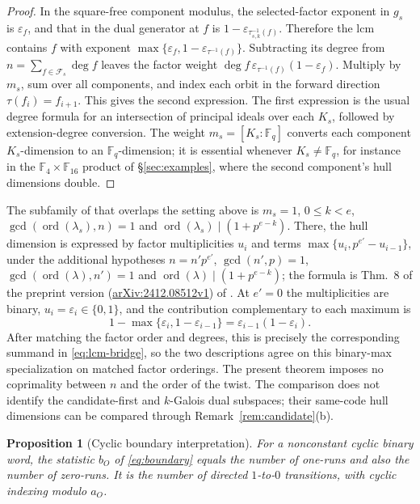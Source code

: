\documentclass[10pt,a4paper]{article}
\newcommand{\F}{\mathbb F}
\newcommand{\Fs}{\mathcal F_s}
\numberwithin{equation}{section}
\theoremstyle{plain}
\newtheorem{proposition}[theorem]{Proposition}
\theoremstyle{definition}
\theoremstyle{remark}
\begin{document}
\begin{proof}
In the square-free component modulus, the selected-factor exponent in $g_s$ is
$\varepsilon_f$, and that in the dual generator at $f$ is
$1-\varepsilon_{\tau_{s,k}^{-1}(f)}$. Therefore the lcm contains $f$ with
exponent $\max\{\varepsilon_f,1-\varepsilon_{\tau^{-1}(f)}\}$. Subtracting its
degree from $n=\sum_{f\in\Fs}\deg f$ leaves the factor weight
$\deg f\,\varepsilon_{\tau^{-1}(f)}(1-\varepsilon_f)$. Multiply by $m_s$, sum
over all components, and index each orbit in the forward direction
$\tau(f_i)=f_{i+1}$. This gives the second expression. The first expression is
the usual degree formula for an intersection of principal ideals over each $K_s$,
followed by extension-degree conversion. The weight $m_s=[K_s:\F_q]$ converts
each component $K_s$-dimension to an $\F_q$-dimension; it is essential whenever
$K_s\ne\F_q$, for instance in the $\F_4\times\F_{16}$ product of
\S\ref{sec:examples}, where the second component's hull dimensions double.
\end{proof}

The subfamily of \cite{debnathAffine2026} that overlaps the setting above is
$m_s=1$, $0\le k<e$, $\gcd(\operatorname{ord}(\lambda_s),n)=1$ and
$\operatorname{ord}(\lambda_s)\mid(1+p^{e-k})$. There, the hull dimension is
expressed by factor multiplicities $u_i$ and terms
$\max\{u_i,p^{e'}-u_{i-1}\}$, under the additional hypotheses $n=n'p^{e'}$,
$\gcd(n',p)=1$, $\gcd(\operatorname{ord}(\lambda),n')=1$ and
$\operatorname{ord}(\lambda)\mid(1+p^{e-k})$; the formula is Thm.~8 of the
preprint version (\href{https://arxiv.org/abs/2412.08512v1}{arXiv:2412.08512v1})
of \cite{debnathAffine2026}. At $e'=0$ the multiplicities are binary,
$u_i=\varepsilon_i\in\{0,1\}$, and the contribution complementary to each maximum
is
\[
1-\max\{\varepsilon_i,1-\varepsilon_{i-1}\}
 =\varepsilon_{i-1}(1-\varepsilon_i).
\]
After matching the factor order and degrees, this is precisely the corresponding
summand in \eqref{eq:lcm-bridge}, so the two descriptions agree on this
binary-max specialization on matched factor orderings. The present theorem
imposes no coprimality between $n$ and the order of the twist. The comparison
does not identify the candidate-first and $k$-Galois dual subspaces; their
same-code hull dimensions can be compared through Remark~\ref{rem:candidate}(b).

\begin{proposition}[Cyclic boundary interpretation]\label{prop:boundary-interpretation}
For a nonconstant cyclic binary word, the statistic $b_O$ of \eqref{eq:boundary}
equals the number of one-runs and also the number of zero-runs. It is the number
of directed $1$-to-$0$ transitions, with cyclic indexing modulo $a_O$.
\end{proposition}
\end{document}

